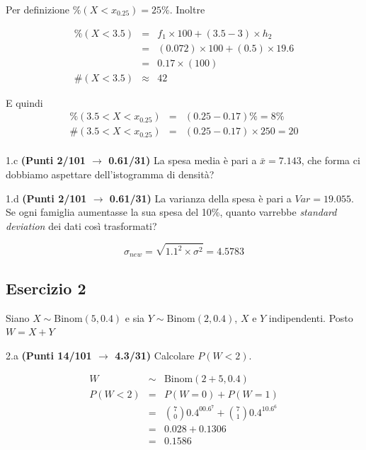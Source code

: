 \documentclass[
  11pt,
]{book}
\theoremstyle{mytheoremstyle}
\theoremstyle{mydefstyle}
\newenvironment{sol}
  {
  \begin{tcolorbox}[enhanced,breakable,arc=0.1mm,boxrule=1pt,colback=white,colframe=iblue,
  title=\bf \fontfamily{lmss}\selectfont \hspace{.5 cm} Soluzione,drop fuzzy shadow]

}{
\end{tcolorbox}
  }
\begin{document}
\begin{sol}
Per definizione \(\%(X<x_{ 0.25 })= 25 \%\). Inoltre

\begin{eqnarray*}
   \%(X< 3.5 ) &=&  f_{ 1 }\times 100 +( 3.5 - 3 )\times h_{ 2 } \\
                &=&  ( 0.072 )\times 100 +( 0.5 )\times  19.6  \\
                &=&  0.17 \times(100) \\
\#(X< 3.5 )    &\approx& 42 
\end{eqnarray*}

E quindi
\begin{eqnarray*}
   \%( 3.5 < X < x_{0.25} ) &=& ( 0.25 - 0.17 )\%= 8 \% \\
   \#( 3.5 < X < x_{0.25} ) &=& ( 0.25 - 0.17 )\times  250 = 20  \\
\end{eqnarray*}

\end{sol}

1.c \textbf{(Punti 2/101 \(\rightarrow\) 0.61/31)} La spesa media è pari a \(\bar x=7.143\), che forma ci dobbiamo aspettare dell'istogramma di densità?

1.d \textbf{(Punti 2/101 \(\rightarrow\) 0.61/31)} La varianza della spesa è pari a \(Var=19.055\).
Se ogni famiglia aumentasse la sua spesa del 10\%, quanto varrebbe \emph{standard deviation} dei dati così trasformati?

\begin{sol}
\[\sigma_{new}=\sqrt{1.1^2\times \sigma^2}=4.5783\]

\end{sol}

\subsection{Esercizio 2}\label{esercizio-2-12}

Siano \(X\sim \text{Binom}(5,0.4)\) e sia \(Y\sim \text{Binom}(2,0.4)\), \(X\) e \(Y\) indipendenti. Posto \(W=X+Y\)

2.a \textbf{(Punti 14/101 \(\rightarrow\) 4.3/31)} Calcolare \(P(W< 2)\).

\begin{sol}
\begin{eqnarray*}
  W &\sim& \text{Binom}(2+5,0.4)\\
  P(W<2) &=& P(W=0)+P(W=1)\\
  &=& \binom{7}{0}0.4^00.6^7+\binom{7}{1}0.4^10.6^6\\
  &=& 0.028+0.1306\\
  &=&0.1586
\end{eqnarray*}

\end{sol}
\end{document}
